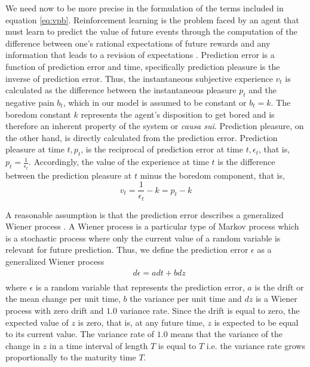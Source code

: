 \documentclass[11pt, onecolumn]{article}
\begin{document}
We need now to be more precise in the formulation of the terms included in equation \ref{eq:vpb}. 
Reinforcement learning is the problem faced by an agent that must learn to predict the value of future events through the computation of the difference between one’s rational expectations of future rewards and any information that leads to a revision of expectations \citep{glimcher_understanding_2011}. Prediction error is a function of prediction error and time, specifically prediction pleasure is the inverse of prediction error. 
Thus, the instantaneous subjective experience $v_t$ is calculated as the difference between the instantaneous pleasure $p_t$ and the negative pain $b_t$, which in our model is assumed to be constant or $b_t=k$. The boredom constant $k$ represents the agent's disposition to get bored and is therefore an inherent property of the system or \emph{causa sui}. Prediction pleasure, on the other hand, is directly calculated from the prediction error. Prediction pleasure at time $t, p_t$, is the reciprocal of prediction error at time $t, \epsilon_t$, that is, $p_t = \frac{1}{\epsilon_t}$.
Accordingly, the value of the experience at time $t$ is the difference between the prediction pleasure at $t$ minus the boredom component, that is,
\begin{equation}
    v_t = \frac{1}{\epsilon_t} - k = p_t - k
\label{eq:vpbt}
\end{equation}

A reasonable assumption is that the prediction error describes a generalized Wiener process \citep{ross_stochastic_1996}. A Wiener process is a particular type of Markov process which is a stochastic process where only the current value of a random variable is relevant for future prediction.  
Thus, we define the prediction error $\epsilon$ as a generalized Wiener process 
\begin{equation}
\begin{split}
& d \epsilon= a dt + b dz \\
\end{split}
\label{eq:genwiener}
\end{equation}
where $\epsilon$ is a random variable that represents the prediction error, $a$ is the drift or the mean change per unit time, $b$ the variance per unit time and $dz$ is a Wiener process with zero drift and $1.0$ variance rate. Since the drift is equal to zero, the expected value of $z$ is zero, that is, at any future time, $z$ is expected to be equal to its current value. The variance rate of $1.0$ means that the variance of the change in $z$ in a time interval of length $T$ is equal to $T$ i.e. the variance rate grows proportionally to the maturity time $T$. 
\end{document}
